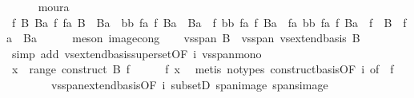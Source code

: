 \begin{isabellebody}
\ \ \ \ \isamarkupfalse%
\ moura\isanewline
\ \ \isamarkupfalse%
\ \isamarkupfalse%
\ f{}{\isacharcolon}{\kern0pt}\ {\isachardoublequoteopen}{\isasymforall}B\ Ba\ f\ fa{\isachardot}{\kern0pt}\ {\isacharparenleft}{\kern0pt}B\ {\isasymnoteq}\ Ba\ {\isasymor}\ bb\ fa\ f\ Ba\ {\isasymin}\ Ba\ {\isasymand}\ f\ {\isacharparenleft}{\kern0pt}bb\ fa\ f\ Ba{\isacharparenright}{\kern0pt}\ {\isasymnoteq}\ fa\ {\isacharparenleft}{\kern0pt}bb\ fa\ f\ Ba{\isacharparenright}{\kern0pt}{\isacharparenright}{\kern0pt}\ {\isasymor}\ f\ {\isacharbackquote}{\kern0pt}\ B\ {\isacharequal}{\kern0pt}\ fa\ {\isacharbackquote}{\kern0pt}\ Ba{\isachardoublequoteclose}\isanewline
\ \ \ \ \isamarkupfalse%
\ {\isacharparenleft}{\kern0pt}meson\ image{\isacharunderscore}{\kern0pt}cong{\isacharparenright}{\kern0pt}\isanewline
\ \ \isamarkupfalse%
\ {\isachardoublequoteopen}vs{}{\isachardot}{\kern0pt}span\ B\ {\isasymsubseteq}\ vs{}{\isachardot}{\kern0pt}span\ {\isacharparenleft}{\kern0pt}vs{}{\isachardot}{\kern0pt}extend{\isacharunderscore}{\kern0pt}basis\ B{\isacharparenright}{\kern0pt}{\isachardoublequoteclose}\isanewline
\ \ \ \ \isamarkupfalse%
\ {\isacharparenleft}{\kern0pt}simp\ add{\isacharcolon}{\kern0pt}\ vs{}{\isachardot}{\kern0pt}extend{\isacharunderscore}{\kern0pt}basis{\isacharunderscore}{\kern0pt}superset{\isacharbrackleft}{\kern0pt}OF\ i{\isacharbrackright}{\kern0pt}\ vs{}{\isachardot}{\kern0pt}span{\isacharunderscore}{\kern0pt}mono{\isacharparenright}{\kern0pt}\isanewline
\ \ \isamarkupfalse%
\ \isamarkupfalse%
\ {\isachardoublequoteopen}x\ {\isasymin}\ range\ {\isacharparenleft}{\kern0pt}construct\ B\ f{\isacharparenright}{\kern0pt}{\isachardoublequoteclose}\isanewline
\ \ \ \ \isamarkupfalse%
\ f{}\ x\ \isamarkupfalse%
\ {\isacharparenleft}{\kern0pt}metis\ {\isacharparenleft}{\kern0pt}no{\isacharunderscore}{\kern0pt}types{\isacharparenright}{\kern0pt}\ construct{\isacharunderscore}{\kern0pt}basis{\isacharbrackleft}{\kern0pt}OF\ i{\isacharcomma}{\kern0pt}\ of\ {\isacharunderscore}{\kern0pt}\ f{\isacharbrackright}{\kern0pt}\isanewline
\ \ \ \ \ \ \ \ vs{}{\isachardot}{\kern0pt}span{\isacharunderscore}{\kern0pt}extend{\isacharunderscore}{\kern0pt}basis{\isacharbrackleft}{\kern0pt}OF\ i{\isacharbrackright}{\kern0pt}\ subsetD\ span{\isacharunderscore}{\kern0pt}image\ spans{\isacharunderscore}{\kern0pt}image{\isacharparenright}{\kern0pt}\isanewline

\end{isabellebody}
